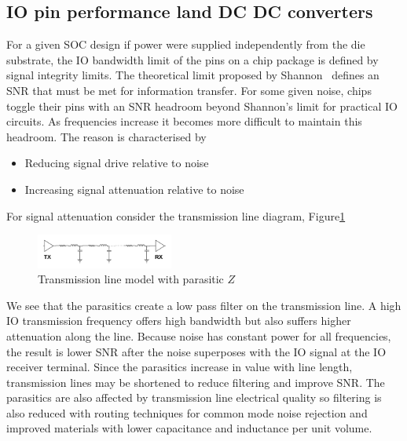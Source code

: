 \documentclass[letterpaper,twocolumn,10pt]{article}
\begin{document}
\subsection{IO pin performance land DC DC converters}

For a given SOC design if power were supplied independently from the die substrate, the IO bandwidth limit of the pins on a chip package is defined by signal integrity limits. The theoretical limit proposed by Shannon~\cite{Shannon1948} defines an SNR that must be met for information transfer. For some given noise, chips toggle their pins with an SNR headroom beyond Shannon's limit for practical IO circuits. As frequencies increase it becomes more difficult to maintain this headroom. The reason is characterised by 
\begin{itemize}
\item Reducing signal drive relative to noise
\item Increasing signal attenuation relative to noise
\end{itemize}


For signal attenuation consider the transmission line diagram, Figure\ref{TXLine}\\
\begin{figure}[here]
\includegraphics[width=0.4\textwidth]{TransmissionLine}
\caption{Transmission line model with parasitic $Z$}
\label{TXLine}
\end{figure}
We see that the parasitics create a low pass filter on the transmission line. A high IO transmission frequency offers high bandwidth but also suffers higher attenuation along the line. Because noise has constant power for all frequencies, the result is lower SNR after the noise superposes with the IO signal at the IO receiver terminal. Since the parasitics increase in value with line length, transmission lines may be shortened to reduce filtering and improve SNR. The parasitics are also affected by transmission line electrical quality so filtering is also reduced with routing techniques for common mode noise rejection and improved materials with lower capacitance and inductance per unit volume.
\end{document}
